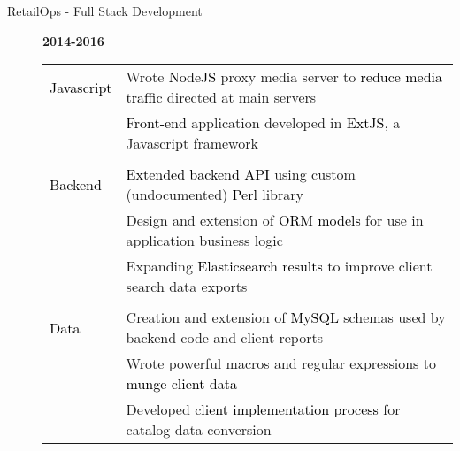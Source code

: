\documentclass[12pt]{article}
\begin{document}
\begin{description}
\begin{description}
                \item[RetailOps - Full Stack Development] \hfill \textbf{2014-2016}\\
		\textcolor{gray}{
                    \begin{tabular}{l|l}
				\\[-1.0mm]
                        \textcolor{black}{Javascript} & Wrote \textcolor{black}{NodeJS} proxy media server to \textcolor{black}{reduce media traffic} directed at main servers \\
				   & \textcolor{black}{Front-end} application developed in \textcolor{black}{ExtJS}, a Javascript framework\\
				\\[-1.7mm]
                        \textcolor{black}{Backend}    & \textcolor{black}{Extended backend API} using custom (undocumented) \textcolor{black}{Perl} library\\
                                   & Design and extension of \textcolor{black}{ORM models} for use in application business logic \\
                                   & Expanding \textcolor{black}{Elasticsearch results} to improve client search data exports\\
				\\[-1.7mm]
                        \textcolor{black}{Data}       & Creation and extension of \textcolor{black}{MySQL} schemas used by backend code and client reports\\
				   & Wrote powerful macros and regular expressions to \textcolor{black}{munge client data}\\
				   & Developed \textcolor{black}{client implementation process} for catalog data conversion\\
                    \end{tabular}
		}
            \end{description}


\end{description}
\end{document}

